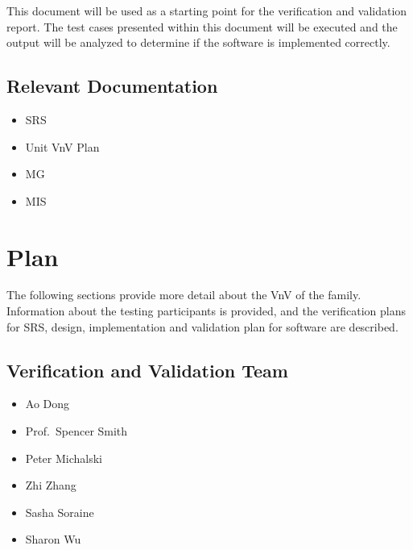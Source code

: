 \documentclass[12pt, titlepage]{article}
\begin{document}
This document will be used as a starting point for the verification and
validation report.  The test cases presented within this document will be
executed and the output will be analyzed to determine if the software is
implemented correctly.

\subsection{Relevant Documentation}

\begin{itemize}
    \item SRS \cite{Dong2019SRS}
    \item Unit VnV Plan \cite{Dong2019UnitVnv}
    \item MG \cite{Dong2019MG}
    \item MIS \cite{Dong2019MIS}
\end{itemize}


\section{Plan} \label{sec_plan}

The following sections provide more detail about the VnV of the
\progname{} family. Information about the testing participants is provided, and
the verification plans for SRS, design, implementation and validation plan for
software are described.

\subsection{Verification and Validation Team}

\begin{itemize}
    \item Ao Dong
    \item Prof.\ Spencer Smith
    \item Peter Michalski
    \item Zhi Zhang
    \item Sasha Soraine
    \item Sharon Wu
    

\end{itemize}
\end{document}
